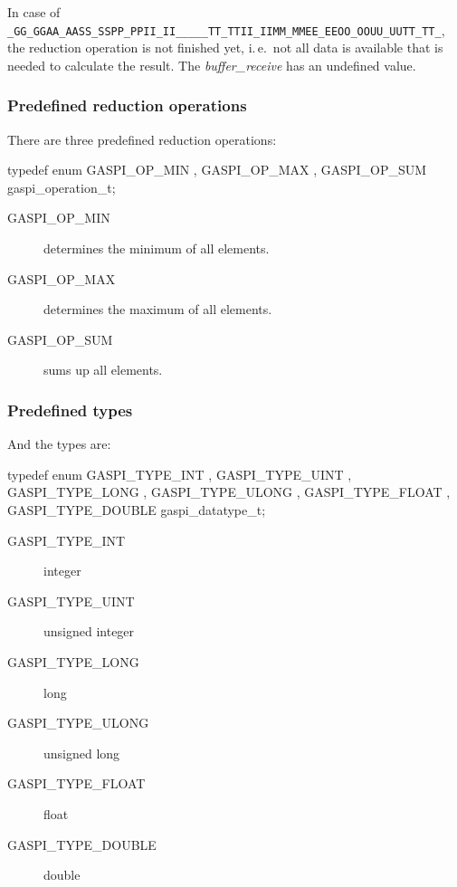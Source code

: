 \documentclass{article}
\makeatletter
\newlength{\st}\setlength{\st}{0pt}
\newcommand{\zerowsep}{\hskip 0pt plus 0.1pt minus 0.1pt}
\newcommand{\ZSEP}[1]{\ifx#1\@@@EOZ@@@\let\next\relax\else\ifx#1\_#1\zerowsep\else#1\fi\let\next\ZSEP\fi\next}
\newcommand{\zsep}[1]{\ZSEP{}#1\@@@EOZ@@@}
\newcommand{\gaspiprefix}{gaspi}
\newcommand{\function}[1]{{\tt #1}}
\newcommand{\parameter}[1]{{\it #1}}
\newcommand{\gaspifunction}[1]{\function{\protect\zsep{\gaspiprefix\_#1}}}
\newcommand{\GASPITIME}{{\tt\protect\zsep{GASPI\_TIMEOUT}}}
\makeatother
\begin{document}

In case of \GASPITIME{}, the reduction operation is not finished yet,
i.\,e.\ not all data is available that is needed to calculate the
result. The \parameter{buffer\_receive} has an undefined value.

\subsubsection{Predefined reduction operations}

There are three predefined reduction operations:

\begin{listing}[99]{2}
typedef enum { GASPI_OP_MIN
             , GASPI_OP_MAX
             , GASPI_OP_SUM
             } gaspi_operation_t;
\end{listing}

\begin{description}
\item[GASPI\_OP\_MIN] determines the minimum of all elements.
\item[GASPI\_OP\_MAX] determines the maximum of all elements.
\item[GASPI\_OP\_SUM] sums up all elements.
\end{description}


\subsubsection{Predefined types}

And the types are:
\begin{listing}[99]{2}
typedef enum { GASPI_TYPE_INT
             , GASPI_TYPE_UINT
             , GASPI_TYPE_LONG
             , GASPI_TYPE_ULONG
             , GASPI_TYPE_FLOAT
             , GASPI_TYPE_DOUBLE
             } gaspi_datatype_t;
\end{listing}

\begin{description}
\item[GASPI\_TYPE\_INT] integer
\item[GASPI\_TYPE\_UINT] unsigned integer
\item[GASPI\_TYPE\_LONG] long
\item[GASPI\_TYPE\_ULONG] unsigned long
\item[GASPI\_TYPE\_FLOAT] float
\item[GASPI\_TYPE\_DOUBLE] double
\end{description}
\end{document}
